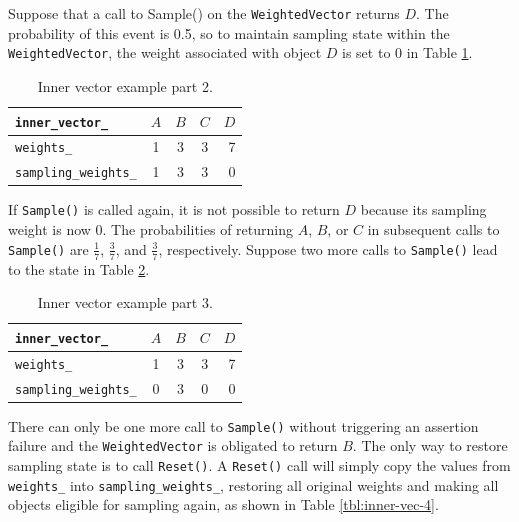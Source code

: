 \documentclass[12pt]{article}
\begin{document}
    \FloatBarrier

    Suppose that a call to Sample() on the \texttt{WeightedVector} returns $D$. The
    probability of this event is 0.5, so to maintain sampling state within the
    \texttt{WeightedVector}, the weight associated with object $D$ is set to 0 in
    Table \ref{tbl:inner-vec-2}.

    \begin{table}[htbp]
      \caption{Inner vector example part 2.}
      \label{tbl:inner-vec-2}
      \begin{center}
      \begin{tabular}{ | l | c | c | c | r | }
        \hline
        \verb|inner_vector_| & $A$ & $B$ & $C$ & $D$ \\ \hline
        \verb|weights_| & 1 & 3 & 3 & 7 \\ \hline
        \verb|sampling_weights_| & 1 & 3 & 3 & 0 \\ \hline
        \hline
      \end{tabular}
      \end{center}
    \end{table}

    \FloatBarrier

    If \texttt{Sample()} is called again, it is not possible to return $D$
    because its
    sampling weight is now 0. The probabilities of returning $A$, $B$, or
    $C$ in subsequent calls to \texttt{Sample()} are $\frac{1}{7}$, $\frac{3}{7}$, and
    $\frac{3}{7}$, respectively. Suppose two more calls to \texttt{Sample()} lead to the
    state in Table \ref{tbl:inner-vec-3}.

    \begin{table}[htbp]
      \caption{Inner vector example part 3.}
      \label{tbl:inner-vec-3}
      \begin{center}
      \begin{tabular}{ | l | c | c | c | r | }
        \hline
        \verb|inner_vector_| & $A$ & $B$ & $C$ & $D$ \\ \hline
        \verb|weights_| & 1 & 3 & 3 & 7 \\ \hline
        \verb|sampling_weights_| & 0 & 3 & 0 & 0 \\ \hline
        \hline
      \end{tabular}
      \end{center}
    \end{table}

    \FloatBarrier

    There can only be one more call to \texttt{Sample()} without triggering an
    assertion failure and the \texttt{WeightedVector} is obligated to return
    $B$. The only way to restore sampling state is to call \texttt{Reset()}. A
    \texttt{Reset()} call will simply copy the values from \texttt{weights\_}
    into \texttt{sampling\_weights\_}, restoring all original weights and
    making all objects eligible for sampling again, as shown in Table
    \ref{tbl:inner-vec-4}.
\end{document}

